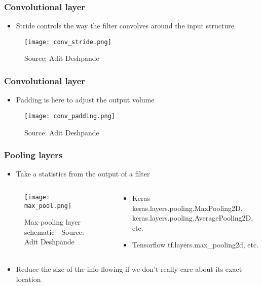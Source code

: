 \documentclass{beamer}
\begin{document}
\begin{frame}
\frametitle{Convolutional layer}
  \begin{itemize}
      \item Stride controls the way the filter convolves around the input structure
   \end{itemize}
    \begin{figure}
		\texttt{[image: conv\_stride.png]}
		\caption{Source: Adit Deshpande}
	 \end{figure}
\end{frame}

\begin{frame}
\frametitle{Convolutional layer}
  \begin{itemize}
      \item Padding is here to adjust the output volume
    \end{itemize}
    \begin{figure}
		\texttt{[image: conv\_padding.png]}
		\caption{Source: Adit Deshpande}
	 \end{figure}
\end{frame}

\begin{frame}
	\frametitle{Pooling layers}
    \begin{itemize}
    \item Take a statistics from the output of a filter
    \end{itemize}
    \begin{columns}[T]
    \begin{column}{.5\textwidth}
    \begin{block}{}
    \begin{figure}
		\texttt{[image: max\_pool.png]}
		\caption{Max-pooling layer schematic - Source: Adit Deshpande}
	\end{figure}
    \end{block}
    \end{column}
    \begin{column}{.5\textwidth}
    \begin{block}{}
    \begin{itemize}
    	\item Keras
        keras.layers.pooling.MaxPooling2D, keras.layers.pooling.AveragePooling2D, etc.
        \item Tensorflow
       tf.layers.max\_pooling2d, etc.
    \end{itemize}
    \end{block}
    \end{column}
    \end{columns}
    \begin{itemize}
    \item Reduce the size of the info flowing if we don't really care about its exact location
    \end{itemize}
\end{frame}
\end{document}
